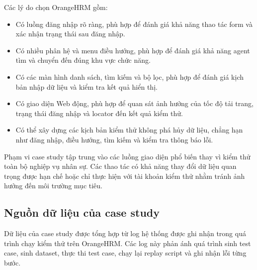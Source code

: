 Các lý do chọn OrangeHRM gồm:

\begin{itemize}
    \item Có luồng đăng nhập rõ ràng, phù hợp để đánh giá khả năng thao tác form và xác nhận trạng thái sau đăng nhập.
    \item Có nhiều phân hệ và menu điều hướng, phù hợp để đánh giá khả năng agent tìm và chuyển đến đúng khu vực chức năng.
    \item Có các màn hình danh sách, tìm kiếm và bộ lọc, phù hợp để đánh giá kịch bản nhập dữ liệu và kiểm tra kết quả hiển thị.
    \item Có giao diện Web động, phù hợp để quan sát ảnh hưởng của tốc độ tải trang, trạng thái đăng nhập và locator đến kết quả kiểm thử.
    \item Có thể xây dựng các kịch bản kiểm thử không phá hủy dữ liệu, chẳng hạn như đăng nhập, điều hướng, tìm kiếm và kiểm tra thông báo lỗi.
\end{itemize}

Phạm vi case study tập trung vào các luồng giao diện phổ biến thay vì kiểm thử toàn bộ nghiệp vụ nhân sự. Các thao tác có khả năng thay đổi dữ liệu quan trọng được hạn chế hoặc chỉ thực hiện với tài khoản kiểm thử nhằm tránh ảnh hưởng đến môi trường mục tiêu.

\subsection{Nguồn dữ liệu của case study}

Dữ liệu của case study được tổng hợp từ log hệ thống được ghi nhận trong quá trình chạy kiểm thử trên OrangeHRM. Các log này phản ánh quá trình sinh test case, sinh dataset, thực thi test case, chạy lại replay script và ghi nhận lỗi từng bước.

